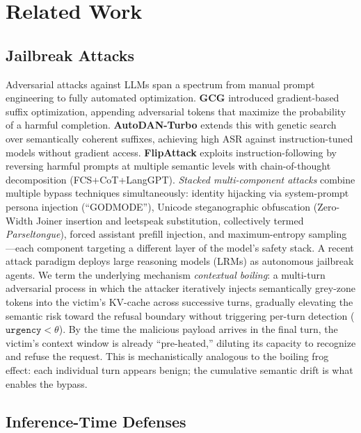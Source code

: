 \documentclass{article}
\begin{document}
\section{Related Work}
\label{sec:related_work}

\subsection{Jailbreak Attacks}

Adversarial attacks against LLMs span a spectrum from manual prompt engineering to
fully automated optimization.
\textbf{GCG} \citep{zou2023universal} introduced gradient-based suffix optimization,
appending adversarial tokens that maximize the probability of a harmful completion.
\textbf{AutoDAN-Turbo} \citep{liu2024autodan} extends this with genetic search over
semantically coherent suffixes, achieving high ASR against instruction-tuned models
without gradient access.
\textbf{FlipAttack} \citep{liu2025flipattack} exploits instruction-following by
reversing harmful prompts at multiple semantic levels with chain-of-thought
decomposition (FCS+CoT+LangGPT).
\textit{Stacked multi-component attacks} combine multiple bypass techniques
simultaneously: identity hijacking via system-prompt persona injection (``GODMODE''),
Unicode steganographic obfuscation (Zero-Width Joiner insertion and leetspeak
substitution, collectively termed \textit{Parseltongue}), forced assistant
prefill injection, and maximum-entropy sampling---each component targeting a
different layer of the model's safety stack.
A recent attack paradigm \citep{hagendorff2026lrm} deploys large reasoning
models (LRMs) as autonomous jailbreak agents.
We term the underlying mechanism \textit{contextual boiling}: a
multi-turn adversarial process in which the attacker iteratively injects
semantically grey-zone tokens into the victim's KV-cache across successive
turns, gradually elevating the semantic risk toward the refusal boundary without
triggering per-turn detection ($\texttt{urgency} < \theta$).
By the time the malicious payload arrives in the final turn, the victim's
context window is already ``pre-heated,'' diluting its capacity to recognize
and refuse the request.
This is mechanistically analogous to the boiling frog effect: each individual
turn appears benign; the cumulative semantic drift is what enables the bypass.

\subsection{Inference-Time Defenses}
\end{document}
